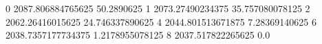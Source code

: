 0 2087.806884765625 50.2890625
1 2073.27490234375 35.757080078125
2 2062.26416015625 24.746337890625
4 2044.801513671875 7.28369140625
6 2038.7357177734375 1.2178955078125
8 2037.517822265625 0.0
